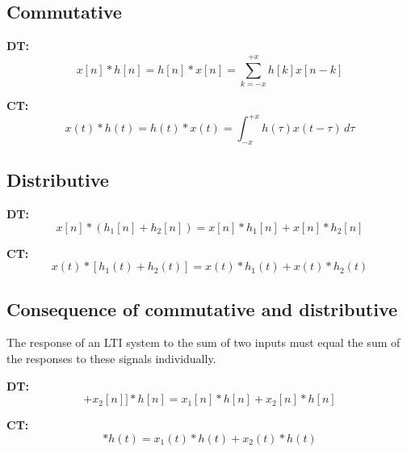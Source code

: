 \subsection{Commutative}
\begin{definition}
    
    \textbf{DT:}
    \begin{equation}
        x[n] * h[n] = h[n] * x[n] = \sum_{k=-x}^{+x} h[k] x[n - k]
    \end{equation}
    
    \textbf{CT:}
    \begin{equation}
        x(t) * h(t) = h(t) * x(t) = \int_{-x}^{+x} h(\tau) x(t - \tau) \, d\tau
    \end{equation}
\end{definition}

\subsection{Distributive}
\begin{definition}

    \textbf{DT:}
    \begin{equation}
        x[n] * (h_1[n] + h_2[n]) = x[n] * h_1[n] + x[n] * h_2[n]
    \end{equation}

    \textbf{CT:}
    \begin{equation}
        x(t) * [h_1(t) + h_2(t)] = x(t) * h_1(t) + x(t) * h_2(t)
    \end{equation}
\end{definition}

\subsection{Consequence of commutative and distributive}
\begin{definition}
    The response of an LTI system to the sum of two inputs must equal the sum of the responses to these signals individually.

    \textbf{DT:}
    \begin{equation}
        [x_1[n] + x_2[n]] * h[n] = x_1[n] * h[n] + x_2[n] * h[n]
    \end{equation}

    \textbf{CT:}
    \begin{equation}
        [x_1(t) + x_2(t)] * h(t) = x_1(t) * h(t) + x_2(t) * h(t)
    \end{equation}
\end{definition}

